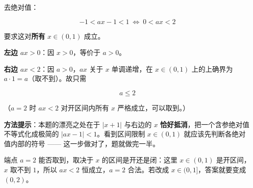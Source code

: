 \begin{answer}
去绝对值：

\nopagebreak[4]
\[-1<ax-1<1\ \Longleftrightarrow\ 0<ax<2\]

要求这对\textbf{所有} $x\in(0,1)$ 成立。

\textbf{左边 $ax>0$}：因 $x>0$，等价于 $a>0$。

\textbf{右边 $ax<2$}：因 $a>0$，$ax$ 关于 $x$ 单调递增，在 $x\in(0,1)$ 上的上确界为 $a\cdot1=a$（取不到）。故只需

\nopagebreak[4]
\[a\le2\]

（$a=2$ 时 $ax<2$ 对开区间内所有 $x$ 严格成立，可以取到。）

\begin{gktip}
\textbf{方法提示}：本题的漂亮之处在于 $|x+1|$ 与右边的 $x$ \textbf{恰好抵消}，把一个含参绝对值不等式化成极简的 $|ax-1|<1$。看到区间限制 $x\in(0,1)$ 就应该先判断各绝对值内部的符号 —— 这一步做对了，题就做完一半。

端点 $a=2$ 能否取到，取决于 $x$ 的区间是开还是闭：这里 $x\in(0,1)$ 是开区间，$x$ 取不到 $1$，所以 $ax<2$ 恒成立，$a=2$ 合法。若改成 $x\in(0,1]$，答案就要变成 $(0,2)$。
\end{gktip}

\par\medskip


\gkanswer{答案（2）：$(0,2]$}

\end{answer}